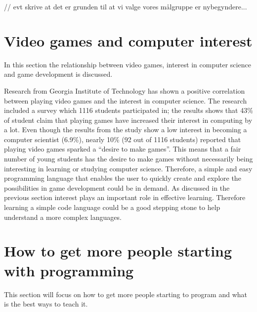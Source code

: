 // evt skrive at det er grunden til at vi valge vores målgruppe er nybegyndere...

\chapter{Video games and computer interest} \label{chap:analysis}
In this section the relationship between video games, interest in computer science and game development is discussed. \newline

Research from Georgia Institute of Technology has shown a positive correlation between playing video games and the interest in computer science. The research included a survey which 1116 students participated in; the results shows that 43\% of student claim that playing games have increased their interest in computing by a lot. 
Even though the results from the study show a low interest in becoming a computer scientist (6.9\%), nearly 10\% (92 out of 1116 students) reported that playing video games sparked a “desire to make games”. 
This means that a fair number of young students has the desire to make games without necessarily being interesting in learning or studying computer science. Therefore, a simple and easy programming language that enables the user to quickly create and explore the possibilities in game development could be in demand.
As discussed in the previous section interest plays an important role in effective learning. Therefore learning a simple code language could be a good stepping stone to help understand a more complex languages.

\chapter{How to get more people starting with programming}\label{chap:analysis}

This section will focus on how to get more people starting to program and what is the best ways to teach it. \newline

